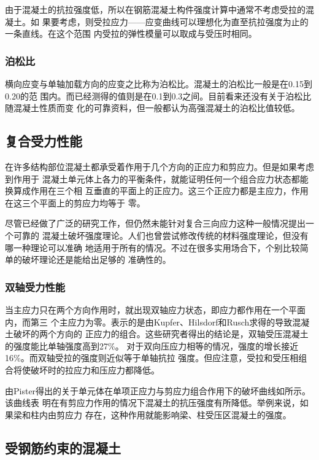 \documentclass[12pt,a4paper]{book}
\begin{document}
由于混凝土的抗拉强度低，所以在钢筋混凝土构件强度计算中通常不考虑受拉的混凝土。如
果要考虑，则受拉应力——应变曲线可以理想化为直至抗拉强度为止的一条直线。在这个范围
内受拉的弹性模量可以取成与受压时相同。

\subsubsection{泊松比}

横向应变与单轴加载方向的应变之比称为泊松比。混凝土的泊松比一般是在0.15到0.20的范
围内。而已经测得的值则是在0.1到0.3之间。目前看来还没有关于泊松比随混凝土性质而变
化的可靠资料，但一般都认为高强混凝土的泊松比值较低。

\subsection{复合受力性能}

在许多结构部位混凝土都承受着作用于几个方向的正应力和剪应力。但是如果考虑到作用于
混凝土单元体上各力的平衡条件，就能证明任何一个组合应力状态都能换算成作用在三个相
互垂直的平面上的正应力。这三个正应力都是主应力，作用在这三个平面上的剪应力均等于
零。

尽管已经做了广泛的研究工作，但仍然未能针对复合三向应力这种一般情况提出一个可靠的
混凝土破坏强度理论。人们也曾尝试修改传统的材料强度理论，但没有哪一种理论可以准确
地适用于所有的情况。不过在很多实用场合下，个别比较简单的破坏理论还是能给出足够的
准确性的。

\subsubsection{双轴受力性能}

当主应力只在两个方向作用时，就出现双轴应力状态，即应力都作用在一个平面内，而第三
个主应力为零。表示的是由Kupfer、Hilsdorf和Rusch求得的导致混凝土破坏的两个方向的
正应力的组合。这些研究者得出的结论是，双轴受压混凝土的强度能比单轴强度高到27\%。
对于双向压应力相等的情况，强度的增长接近16\%。而双轴受拉的强度则近似等于单轴抗拉
强度。但应注意，受拉和受压相组合将使破坏时的拉应力和压应力都降低。

由Pister得出的关于单元体在单项正应力与剪应力组合作用下的破坏曲线如所示。该曲线表
明在有剪应力作用的情况下混凝土的抗压强度有所降低。举例来说，如果梁和柱内由剪应力
存在，这种作用就能影响梁、柱受压区混凝土的强度。

\subsection{受钢筋约束的混凝土}
\end{document}

